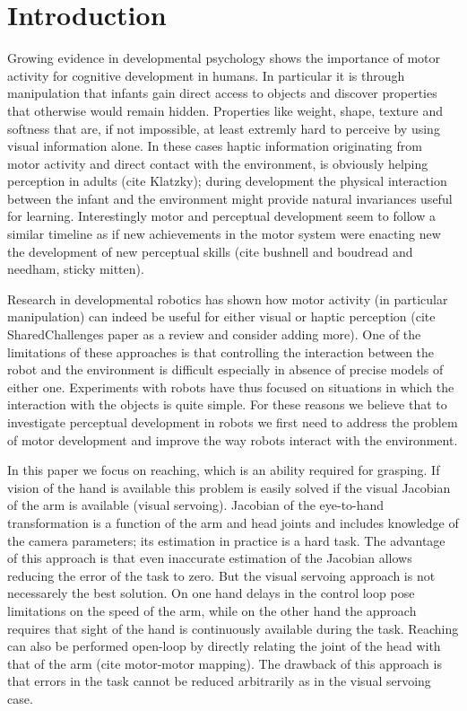 \section{Introduction}
Growing evidence in developmental psychology shows the importance 
of motor activity for cognitive development in humans. In particular 
it is through manipulation that infants gain direct access to objects 
and discover properties that otherwise would remain hidden. 
Properties like weight, shape, texture and softness that 
are, if not impossible, at least extremly hard to perceive by using
visual information alone. In these cases haptic information originating 
from motor activity and direct contact with the environment, is 
obviously helping perception in adults (cite Klatzky); during development
the physical interaction between the infant and the environment might
provide natural invariances useful for learning.
Interestingly motor and perceptual development seem to follow a similar 
timeline as if new achievements in the motor system were enacting new
the development of new perceptual skills (cite bushnell and boudread 
and needham, sticky mitten).

Research in developmental robotics has shown how motor activity (in particular 
manipulation) can indeed be useful for either visual or haptic perception (cite 
SharedChallenges paper as a review and consider adding more). One of the 
limitations of these approaches is that controlling the interaction between
the robot and the environment is difficult especially in absence of precise
models of either one. Experiments with robots have thus focused on situations
in which the interaction with the objects is quite simple. For these reasons
we believe that to investigate perceptual development in robots we first need to 
address the problem of motor development and improve the way robots interact
with the environment.

In this paper we focus on reaching, which is an ability required for grasping. 
If vision of the hand is available this problem is easily solved if the 
visual Jacobian of the arm is available (visual servoing). Jacobian of the 
eye-to-hand transformation is a function of the arm and head joints and includes 
knowledge of the camera parameters; its estimation in practice is a hard task. 
The advantage of this approach is that even inaccurate estimation of the Jacobian
allows reducing the error of the task to zero. But the visual servoing approach 
is not necessarely the best solution. On one hand delays in the control loop pose 
limitations on the speed of the arm, while on the other hand the approach requires 
that sight of the hand is continuously available during the task. Reaching can 
also be performed open-loop by directly relating the joint of the head with that of
the arm (cite motor-motor mapping). The drawback of this approach is that errors 
in the task cannot be reduced arbitrarily as in the visual servoing case.

